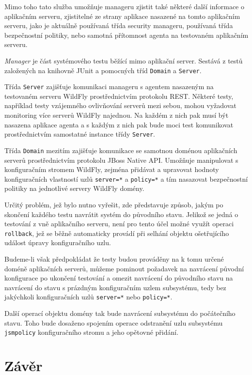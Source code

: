 Mimo toho tato služba umožňuje manageru zjistit také některé další informace o aplikačním serveru, zjistitelné ze strany aplikace nasazené na tomto aplikačním serveru, jako je aktuálně používaná třída security manageru, používaná třída bezpečnostní politiky, nebo samotná přítomnost agenta na testovaném aplikačním serveru.

{\it Manager} je část systémového testu běžící mimo aplikační server. Sestává z testů založených na knihovně JUnit a pomocných tříd {\tt Domain} a {\tt Server}.

Třída {\tt Server} zajišťuje komunikaci manageru s agentem nasazeným na testovaném serveru WildFly prostřednictvím protokolu REST. Některé testy, například testy vzájemného ovlivňování serverů mezi sebou, mohou vyžadovat monitoring více serverů WildFly najednou. Na každém z nich pak musí být nasazena aplikace agenta a s každým z nich pak bude moci test komunikovat prostřednictvím samostatné instance třídy {\tt Server}.

Třída {\tt Domain} mezitím zajišťuje komunikace se samotnou doménou aplikačních serverů prostřednictvím protokolu JBoss Native API. Umožňuje manipulovat s konfiguračním stromem WildFly, zejména přidávat a upravovat hodnoty konfiguračních vlastností uzlů {\tt server=*} a {\tt policy=*} a tím nasazovat bezpečnostní politiky na jednotlivé servery WildFly domény.

Určitý problém, jež bylo nutno vyřešit, zde představuje způsob, jakým po skončení každého testu navrátit systém do původního stavu. Jelikož se jedná o testování z vně aplikačního serveru, není pro tento účel možné využít operaci {\tt rollback}, jež se běžně automaticky provádí při selhání objektu ošetřujícího událost úpravy konfiguračního uzlu.

Budeme-li však předpokládat že testy budou prováděny na k tomu určené doméně aplikačních serverů, můžeme pominout požadavek na navrácení původní konfigurace po ukončení testování a omezit navrácení do původního stavu na navrácení do stavu s prázdným konfiguračním uzlem subsystému, tedy bez jakýchkoli konfiguračních uzlů 
{\tt server=*} nebo {\tt policy=*}.

Další operací objektu domény tak bude navrácení subsystému do počátečního stavu. Toho bude dosaženo spojením operace odstranění uzlu subsystému {\tt jsmpolicy} konfiguračního stromu a jeho opětovné přidání.

\chapter{Závěr}

